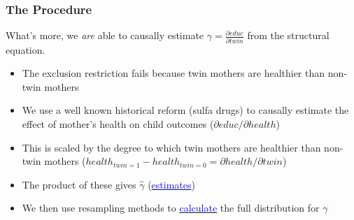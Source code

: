 \documentclass[9pt,letterpaper,subeqn]{beamer}
\begin{document}

\begin{frame}[label=gammaDiscuss]
  \frametitle{The Procedure}
  What's more, we \emph{are} able to causally estimate $\gamma=\frac{\partial educ}{\partial twin}$ from the structural equation.
  \vspace{4mm}
  \begin{itemize}
  \item The exclusion restriction fails because twin mothers are healthier than non-twin mothers
  \item We use a well known historical reform (sulfa drugs) to causally estimate the effect of mother's
    health on child outcomes ($\partial educ/\partial health$)
  \item This is scaled by the degree to which twin mothers are healthier than non-twin mothers
    ($health_{twin=1}-health_{twin=0}=\partial health/\partial twin$)
  \item The product of these gives $\hat\gamma$ (\hyperlink{gammaEst}{\textcolor{blue}{estimates}})
  \item We then use resampling methods to \hyperlink{gammaResamp}{\textcolor{blue}{calculate}} the full distribution for $\gamma$
  \end{itemize}
\end{frame}
\end{document}
